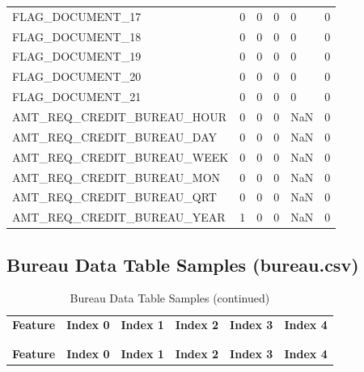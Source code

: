 \documentclass[12pt, letterpaper]{article}
\begin{document}
\begin{appendices}
{\begin{longtable}[c]{| l || p{2cm} | p{2cm} | p{2cm} | p{2cm} | p{2cm} |}
FLAG_DOCUMENT_17	&	0	&	0	&	0	&	0	&	0	\\
FLAG_DOCUMENT_18	&	0	&	0	&	0	&	0	&	0	\\
FLAG_DOCUMENT_19	&	0	&	0	&	0	&	0	&	0	\\
FLAG_DOCUMENT_20	&	0	&	0	&	0	&	0	&	0	\\
FLAG_DOCUMENT_21	&	0	&	0	&	0	&	0	&	0	\\
AMT_REQ_CREDIT_BUREAU_HOUR	&	0	&	0	&	0	&	NaN	&	0	\\
AMT_REQ_CREDIT_BUREAU_DAY	&	0	&	0	&	0	&	NaN	&	0	\\
AMT_REQ_CREDIT_BUREAU_WEEK	&	0	&	0	&	0	&	NaN	&	0	\\
AMT_REQ_CREDIT_BUREAU_MON	&	0	&	0	&	0	&	NaN	&	0	\\
AMT_REQ_CREDIT_BUREAU_QRT	&	0	&	0	&	0	&	NaN	&	0	\\
AMT_REQ_CREDIT_BUREAU_YEAR	&	1	&	0	&	0	&	NaN	&	0	\\
\end{longtable}
}
\normalsize

\subsection{Bureau Data Table Samples (bureau.csv)}
\label{appendix:bureaudatatablesamples}

\tiny
{}
{
\begin{longtable}[c]{| l || p{2cm} | p{2cm} | p{2cm} | p{2cm} | p{2cm} |}

 \caption{Bureau Data Table Samples\label{bureaudatatablesamples}}\\

 \hline
 \rowcolor{white} \multicolumn{6}{| c |}{\textbf{bureau.csv Samples}}\\
 \hline
 \rowcolor{white} \textbf{Feature} & \textbf{Index 0} & \textbf{Index 1} & \textbf{Index 2} & \textbf{Index 3} & \textbf{Index 4}\\
 \hline
 \endfirsthead

 \rowcolor{white} \caption[]{Bureau Data Table Samples (continued)}\\
 \rowcolor{white} \hline
 \rowcolor{white} \multicolumn{6}{|c|}{\textbf{bureau.csv Samples}\ref{bureaudatatablesamples}}\\
 \hline
 \rowcolor{white} \textbf{Feature} & \textbf{Index 0} & \textbf{Index 1} & \textbf{Index 2} & \textbf{Index 3} & \textbf{Index 4}\\
 \hline
 \endhead


\end{longtable}}
\end{appendices}
\end{document}
